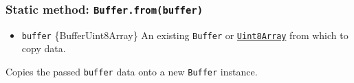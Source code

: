 \subsubsection{\texorpdfstring{Static method:
\texttt{Buffer.from(buffer)}}{Static method: Buffer.from(buffer)}}\label{static-method-buffer.frombuffer}

\begin{itemize}
\tightlist
\item
  \texttt{buffer} \{Buffer\textbar Uint8Array\} An existing
  \texttt{Buffer} or
  \href{https://developer.mozilla.org/en-US/docs/Web/JavaScript/Reference/Global_Objects/Uint8Array}{\texttt{Uint8Array}}
  from which to copy data.
\end{itemize}

Copies the passed \texttt{buffer} data onto a new \texttt{Buffer}
instance.

\begin{Shaded}
\begin{Highlighting}[]
\NormalTok{ \{ }\NormalTok{ \} } \OperatorTok{;}

\OperatorTok{=} \NormalTok{(}\NormalTok{)}\OperatorTok{;}
\OperatorTok{=} \OperatorTok{;}

\NormalTok{buf1[}\NormalTok{] }\OperatorTok{=} \OperatorTok{;}

\NormalTok{())}\OperatorTok{;}
\NormalTok{())}\OperatorTok{;}
\end{Highlighting}
\end{Shaded}

